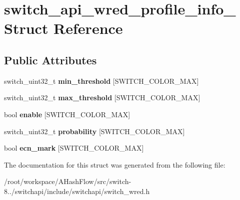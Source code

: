 \hypertarget{structswitch__api__wred__profile__info__}{\section{switch\+\_\+api\+\_\+wred\+\_\+profile\+\_\+info\+\_\+ Struct Reference}
\label{structswitch__api__wred__profile__info__}
}
\subsection*{Public Attributes}
\begin{DoxyCompactItemize}
\item 
\hypertarget{structswitch__api__wred__profile__info___ac624cad7006c7d65ffd4e0f5665b0ee8}{switch\+\_\+uint32\+\_\+t {\bfseries min\+\_\+threshold} \mbox{[}S\+W\+I\+T\+C\+H\+\_\+\+C\+O\+L\+O\+R\+\_\+\+M\+A\+X\mbox{]}}\label{structswitch__api__wred__profile__info___ac624cad7006c7d65ffd4e0f5665b0ee8}

\item 
\hypertarget{structswitch__api__wred__profile__info___af0b827c52c8587c974244aadeafd71a2}{switch\+\_\+uint32\+\_\+t {\bfseries max\+\_\+threshold} \mbox{[}S\+W\+I\+T\+C\+H\+\_\+\+C\+O\+L\+O\+R\+\_\+\+M\+A\+X\mbox{]}}\label{structswitch__api__wred__profile__info___af0b827c52c8587c974244aadeafd71a2}

\item 
\hypertarget{structswitch__api__wred__profile__info___afdff545d96fe27bf86e665e26b3fb893}{bool {\bfseries enable} \mbox{[}S\+W\+I\+T\+C\+H\+\_\+\+C\+O\+L\+O\+R\+\_\+\+M\+A\+X\mbox{]}}\label{structswitch__api__wred__profile__info___afdff545d96fe27bf86e665e26b3fb893}

\item 
\hypertarget{structswitch__api__wred__profile__info___ae5fddea975e45b28e7c513b51f0a1933}{switch\+\_\+uint32\+\_\+t {\bfseries probability} \mbox{[}S\+W\+I\+T\+C\+H\+\_\+\+C\+O\+L\+O\+R\+\_\+\+M\+A\+X\mbox{]}}\label{structswitch__api__wred__profile__info___ae5fddea975e45b28e7c513b51f0a1933}

\item 
\hypertarget{structswitch__api__wred__profile__info___aa7cd2595827677a193a9e4f3eaa3d965}{bool {\bfseries ecn\+\_\+mark} \mbox{[}S\+W\+I\+T\+C\+H\+\_\+\+C\+O\+L\+O\+R\+\_\+\+M\+A\+X\mbox{]}}\label{structswitch__api__wred__profile__info___aa7cd2595827677a193a9e4f3eaa3d965}

\end{DoxyCompactItemize}


The documentation for this struct was generated from the following file\+:\begin{DoxyCompactItemize}
\item 
/root/workspace/\+A\+Hash\+Flow/src/switch-\/8../switchapi/include/switchapi/switch\+\_\+wred.\+h\end{DoxyCompactItemize}
